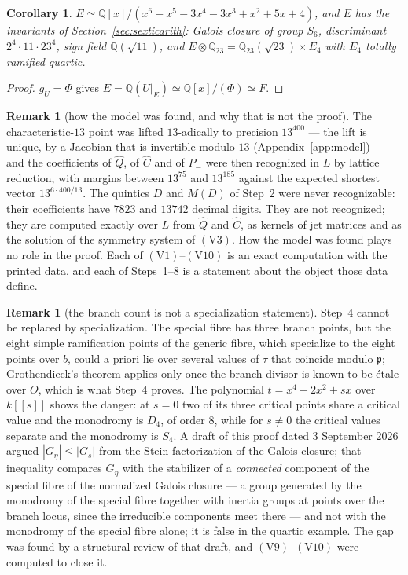 \documentclass[11pt]{amsart}
\newcommand{\QQ}{\mathbb{Q}}
\newcommand{\gU}{g_U}
\newcommand{\sextic}{x^6-x^5-3x^4-3x^3+x^2+5x+4}
\newcommand{\pp}{\mathfrak p}
\theoremstyle{plain}
\newtheorem{corollary}[theorem]{Corollary}
\theoremstyle{definition}
\newtheorem{remark}[theorem]{Remark}
\begin{document}
\begin{corollary}\label{prop:sextic}
$E\simeq\QQ[x]/(\sextic)$, and $E$ has the invariants of
Section~\ref{sec:sexticarith}: Galois closure of group $S_6$,
discriminant $2^4\cdot11\cdot23^4$, sign field $\QQ(\sqrt{11})$, and
$E\otimes\QQ_{23}=\QQ_{23}(\sqrt{23})\times E_4$ with $E_4$ totally
ramified quartic.
\end{corollary}
\begin{proof}
$\gU=\Phi$ gives $E=\QQ(U|_E)\simeq\QQ[x]/(\Phi)\simeq F$.
\end{proof}

\begin{remark}[how the model was found, and why that is not the proof]\label{rem:relqfound}
The characteristic-$13$ point was lifted $13$-adically to precision
$13^{400}$ --- the lift is unique, by a Jacobian that is invertible
modulo $13$ (Appendix~\ref{app:model}) --- and the coefficients of
$\hat Q$, of $\hat C$ and of $P_-$ were then recognized in $L$ by
lattice reduction, with margins between $13^{75}$ and $13^{185}$
against the expected shortest vector $13^{6\cdot400/13}$. The quintics
$D$ and $M(D)$ of Step~2 were never recognizable: their coefficients
have $7823$ and $13742$ decimal digits. They are not recognized; they
are computed exactly over $L$ from $\hat Q$ and $\hat C$, as kernels
of jet matrices and as the solution of the symmetry system of
$(\mathrm V3)$. How the model was found plays no role in the proof.
Each of $(\mathrm V1)$--$(\mathrm V10)$ is an exact computation with
the printed data, and each of Steps~1--8 is a statement about the
object those data define.
\end{remark}

\begin{remark}[the branch count is not a specialization statement]\label{rem:gap}
Step~4 cannot be replaced by specialization. The special fibre has
three branch points, but the eight simple ramification points of the
generic fibre, which specialize to the eight points over $\bar b$,
could a priori lie over several values of $\tau$ that coincide modulo
$\pp$; Grothendieck's theorem applies only once the branch divisor is
known to be \'etale over $O$, which is what Step~4 proves. The
polynomial $t=x^4-2x^2+sx$ over $k[[s]]$ shows the danger: at $s=0$
two of its three critical points share a critical value and the
monodromy is $D_4$, of order $8$, while for $s\ne0$ the critical
values separate and the monodromy is $S_4$. A draft of this proof
dated 3 September 2026 argued $|G_\eta|\le|G_s|$ from the Stein
factorization of the Galois closure; that inequality compares
$G_\eta$ with the stabilizer of a \emph{connected} component of the
special fibre of the normalized Galois closure --- a group generated
by the monodromy of the special fibre together with inertia groups at
points over the branch locus, since the irreducible components meet
there --- and not with the monodromy of the special fibre alone; it
is false in the quartic example. The gap was found by a structural review of that draft, and
$(\mathrm V9)$--$(\mathrm V10)$ were computed to close it.
\end{remark}
\end{document}
